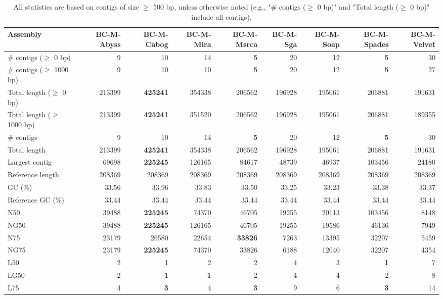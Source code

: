 \documentclass[12pt,a4paper]{article}
\begin{document}
\begin{table}[ht]
\begin{center}
\caption{All statistics are based on contigs of size $\geq$ 500 bp, unless otherwise noted (e.g., "\# contigs ($\geq$ 0 bp)" and "Total length ($\geq$ 0 bp)" include all contigs).}
\begin{tabular}{|l*{8}{|r}|}
\hline
Assembly & BC-M-Abyss & BC-M-Cabog & BC-M-Mira & BC-M-Msrca & BC-M-Sga & BC-M-Soap & BC-M-Spades & BC-M-Velvet \\ \hline
\# contigs ($\geq$ 0 bp) & 9 & 10 & 14 & {\bf 5} & 20 & 12 & {\bf 5} & 30 \\ \hline
\# contigs ($\geq$ 1000 bp) & 9 & 10 & 10 & {\bf 5} & 20 & 12 & {\bf 5} & 27 \\ \hline
Total length ($\geq$ 0 bp) & 213399 & {\bf 425241} & 354338 & 206562 & 196928 & 195061 & 206881 & 191631 \\ \hline
Total length ($\geq$ 1000 bp) & 213399 & {\bf 425241} & 351520 & 206562 & 196928 & 195061 & 206881 & 189355 \\ \hline
\# contigs & 9 & 10 & 14 & {\bf 5} & 20 & 12 & {\bf 5} & 30 \\ \hline
Total length & 213399 & {\bf 425241} & 354338 & 206562 & 196928 & 195061 & 206881 & 191631 \\ \hline
Largest contig & 69698 & {\bf 225245} & 126165 & 84617 & 48739 & 46937 & 103456 & 24180 \\ \hline
Reference length & 208369 & 208369 & 208369 & 208369 & 208369 & 208369 & 208369 & 208369 \\ \hline
GC (\%) & 33.56 & 33.96 & 33.83 & 33.50 & 33.25 & 33.23 & 33.38 & 33.37 \\ \hline
Reference GC (\%) & 33.44 & 33.44 & 33.44 & 33.44 & 33.44 & 33.44 & 33.44 & 33.44 \\ \hline
N50 & 39488 & {\bf 225245} & 74370 & 46705 & 19255 & 20113 & 103456 & 8148 \\ \hline
NG50 & 39488 & {\bf 225245} & 126165 & 46705 & 19255 & 19586 & 46136 & 7949 \\ \hline
N75 & 23179 & 26580 & 22654 & {\bf 33826} & 7263 & 13395 & 32207 & 5459 \\ \hline
NG75 & 23179 & {\bf 225245} & 74370 & 33826 & 6188 & 12040 & 32207 & 4354 \\ \hline
L50 & 2 & {\bf 1} & 2 & 2 & 4 & 3 & {\bf 1} & 7 \\ \hline
LG50 & 2 & {\bf 1} & {\bf 1} & 2 & 4 & 4 & 2 & 8 \\ \hline
L75 & 4 & {\bf 3} & 4 & {\bf 3} & 9 & 6 & {\bf 3} & 14 \\ \hline

\end{tabular}
\end{center}
\end{table}
\end{document}
